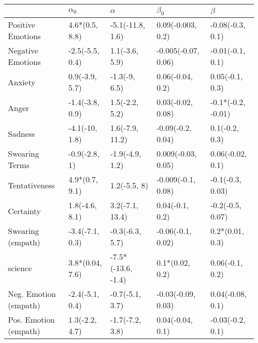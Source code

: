 \begin{tabular}{lllll}
\toprule
{} &       $\alpha_0$ &            $\alpha$ &            $\beta_0$ &             $\beta$ \\
\midrule
Positive Emotions     &   4.6*(0.5, 8.8) &    -5.1(-11.8, 1.6) &    0.09(-0.003, 0.2) &    -0.08(-0.3, 0.1) \\
Negative Emotions     &  -2.5(-5.5, 0.4) &      1.1(-3.6, 5.9) &  -0.005(-0.07, 0.06) &    -0.01(-0.1, 0.1) \\
Anxiety               &   0.9(-3.9, 5.7) &       -1.3(-9, 6.5) &     0.06(-0.04, 0.2) &     0.05(-0.1, 0.3) \\
Anger                 &  -1.4(-3.8, 0.9) &      1.5(-2.2, 5.2) &    0.03(-0.02, 0.08) &  -0.1*(-0.2, -0.01) \\
Sadness               &   -4.1(-10, 1.8) &     1.6(-7.9, 11.2) &    -0.09(-0.2, 0.04) &      0.1(-0.2, 0.3) \\
Swearing Terms        &    -0.9(-2.8, 1) &     -1.9(-4.9, 1.2) &   0.009(-0.03, 0.05) &    0.06(-0.02, 0.1) \\
Tentativeness         &   4.9*(0.7, 9.1) &        1.2(-5.5, 8) &   -0.009(-0.1, 0.08) &    -0.1(-0.3, 0.03) \\
Certainty             &   1.8(-4.6, 8.1) &     3.2(-7.1, 13.4) &      0.04(-0.1, 0.2) &    -0.2(-0.5, 0.07) \\
Swearing (empath)     &  -3.4(-7.1, 0.3) &     -0.3(-6.3, 5.7) &    -0.06(-0.1, 0.02) &     0.2*(0.01, 0.3) \\
science               &  3.8*(0.04, 7.6) &  -7.5*(-13.6, -1.4) &      0.1*(0.02, 0.2) &     0.06(-0.1, 0.2) \\
Neg. Emotion (empath) &  -2.4(-5.1, 0.4) &     -0.7(-5.1, 3.7) &   -0.03(-0.09, 0.03) &    0.04(-0.08, 0.1) \\
Pos. Emotion (empath) &   1.3(-2.2, 4.7) &     -1.7(-7.2, 3.8) &     0.04(-0.04, 0.1) &    -0.03(-0.2, 0.1) \\
\bottomrule
\end{tabular}
